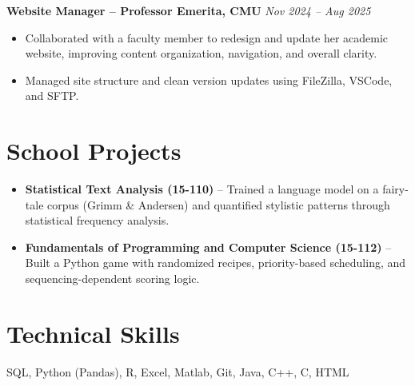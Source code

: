 \documentclass[10.5pt]{article}
\begin{document}
\noindent\textbf{Website Manager – Professor Emerita, CMU} \hfill \textit{Nov 2024 – Aug 2025}\\[-1.3em]
\begin{itemize}
  \item Collaborated with a faculty member to redesign and update her academic website, improving content organization, navigation, and overall clarity.
  \item Managed site structure and clean version updates using FileZilla, VSCode, and SFTP.
\end{itemize}


\section{School Projects}
\begin{itemize}
  \item \textbf{Statistical Text Analysis (15-110)} – Trained a language model on a fairy-tale corpus (Grimm \& Andersen) and quantified stylistic patterns through statistical frequency analysis.
  \item \textbf{Fundamentals of Programming and Computer Science (15-112)} – Built a Python game with randomized recipes, priority-based scheduling, and sequencing-dependent scoring logic.
\end{itemize}
\section{Technical Skills}
SQL, Python (Pandas), R, Excel, Matlab, Git, Java, C++, C, HTML
\end{document}

